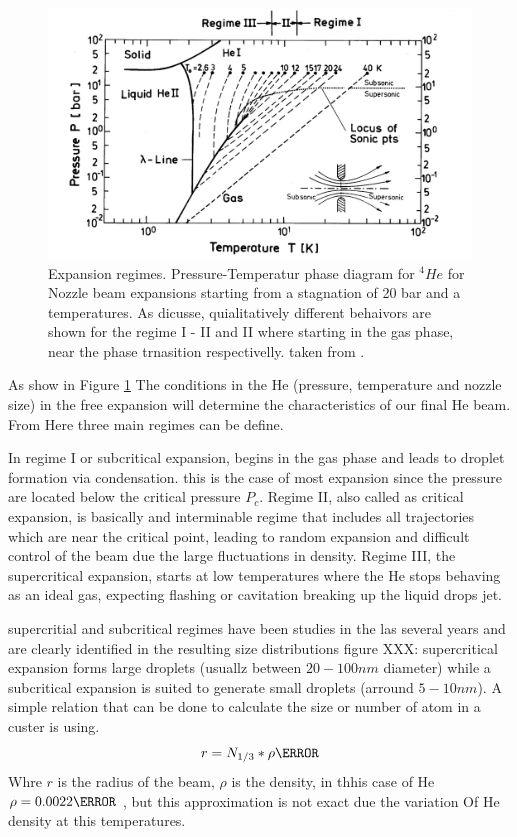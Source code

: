\begin{figure}[hbtp] \label{fig:ExpRegim}
\centering
\includegraphics[width= 13 cm]{../Images/expansion_regimes.PNG}
\caption[Phase diagram for Expantion regimens]{Expansion regimes. Pressure-Temperatur phase diagram for $^{4}He$ for Nozzle beam expansions starting from a stagnation of 20 bar and a temperatures. As dicusse, quialitatively different behaivors are shown for the regime I - II and II where  starting in the gas phase,  near the phase trnasition respectivelly. taken from \cite{buchenau_mass_1990}. }
\end{figure}

As show in Figure \ref{fig:ExpRegim} The conditions in the He (pressure, temperature and nozzle size) in the free expansion will determine the characteristics of our final He beam. From Here three main regimes can be define.

In regime I or subcritical expansion, begins in the gas phase and leads to droplet formation via condensation. this is the case of most expansion since the pressure are located below the critical pressure $P_{c}$.
Regime II, also called as critical expansion, is basically  and interminable regime that includes all trajectories which are near the critical point, leading to random expansion and difficult control of the beam due the large fluctuations in density.
Regime III, the  supercritical expansion, starts at low temperatures where the He stops behaving as an ideal gas, expecting flashing or cavitation  breaking up the liquid drops jet. \cite{buchenau_mass_1990}

supercritial and subcritical regimes have been studies  in the las several years and  are clearly identified in the resulting size distributions  figure XXX: supercritical expansion forms large droplets (usuallz between $20-100 nm$ diameter) while a subcritical expansion is suited to generate small droplets (arround $5-10 nm$).  A simple relation that can be done to calculate the size or number of atom in a custer is using. \begin{equation}
r=N_{1/3} * \rho\angstrom
\end{equation}
Whre $r$ is the radius of the beam, $\rho$ is the density, in thhis case of He $\rho =0.0022 \angstrom$ \cite{stringari_systematics_1987}, but this approximation is not exact due the variation Of He density at this temperatures.
